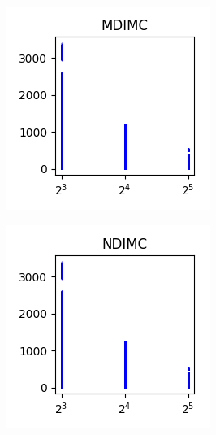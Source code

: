\documentclass[sigconf,authorversion]{acmart}
\begin{document}
\begin{figure}[htb]\ContinuedFloat
    \centering
    \begin{subfigure}[b]{0.3\textwidth}
        \includegraphics[width=\textwidth]{img/MDIMC.png}
        \label{fig:mdimc}
    \end{subfigure}
    \begin{subfigure}[b]{0.3\textwidth}
        \includegraphics[width=\textwidth]{img/NDIMC.png}

\end{subfigure}
\end{figure}
\end{document}
